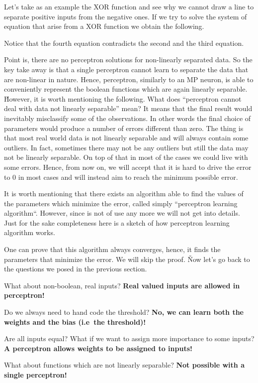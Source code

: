 \be
Let's take as an example the XOR function and see why we cannot draw a line to separate positive inputs from the
negative ones. If we try to solve the system of equation that arise from a XOR function we obtain the following.


\vspace{-5pt}

Notice that the fourth equation contradicts the second and the third equation.
\ee

Point is, there are no perceptron solutions for non-linearly separated data. So the key take away is that a single
perceptron cannot learn to separate the data that are non-linear in nature. Hence, perceptron, similarly to an MP
neuron, is able to conveniently represent the boolean functions which are again linearly separable. \v

However, it is worth mentioning the following. What does ``perceptron cannot deal with data not linearly separable''
mean? It means that the final result would inevitably misclassify some of the observations. In other words the final
choice of parameters would produce a number of errors different than zero. The thing is that most real world data is
not linearly separable and will always contain some outliers. In fact, sometimes there may not be any outliers but
still the data may not be linearly separable. On top of that in most of the cases we could live with some errors.
Hence, from now on, we will accept that it is hard to drive the error to 0 in most cases and will instead aim to
reach the minimum possible error.


It is worth mentioning that there exists an algorithm able to find the values of the parameters which minimize the
error, called simply ``perceptron learning algorithm``. However, since is not of use any more we will not get into
details. Just for the sake completeness here is a sketch of how perceptron learning algorithm works.


One can prove that this algorithm always converges, hence, it finds the parameters that minimize the error. We will
skip the proof. \v

Now let's go back to the questions we posed in the previous section.
\bit
\item What about non-boolean, real inputs? \textbf{Real valued inputs are allowed in perceptron!}
\item Do we always need to hand code the threshold? \textbf{No, we can learn both the weights and the bias (i.e\ the
threshold)!}
\item Are all inputs equal? What if we want to assign more importance to some inputs? \textbf{A perceptron allows
weights to be assigned to inputs!}
\item What about functions which are not linearly separable? \textbf{Not possible with a single perceptron!}
\eit

